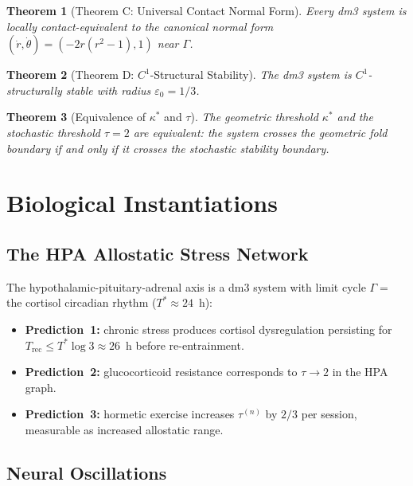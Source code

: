 \documentclass[11pt, twoside, openright]{book}
\theoremstyle{plain}
\newtheorem{theorem}{Theorem}[chapter]
\theoremstyle{definition}
\newcommand{\eps}{\varepsilon_0}
\begin{document}
\begin{theorem}[Theorem C: Universal Contact Normal Form]
Every dm3 system is locally contact-equivalent to the canonical normal
form $(\dot r, \dot\theta) = (-2r(r^2-1), 1)$ near $\Gamma$.
\end{theorem}

\begin{theorem}[Theorem D: $C^1$-Structural Stability]
The dm3 system is $C^1$-structurally stable with radius $\eps = 1/3$.
\end{theorem}

\begin{theorem}[Equivalence of $\kappa^*$ and $\tau$]
The geometric threshold $\kappa^*$ and the stochastic threshold $\tau = 2$
are equivalent: the system crosses the geometric fold boundary if and
only if it crosses the stochastic stability boundary.
\end{theorem}

\chapter{Biological Instantiations}

\section{The HPA Allostatic Stress Network}

The hypothalamic-pituitary-adrenal axis is a dm3 system with limit
cycle $\Gamma =$ the cortisol circadian rhythm ($T^* \approx 24$~h):
\begin{itemize}[leftmargin=*]
  \item \textbf{Prediction~1:} chronic stress produces cortisol
    dysregulation persisting for $T_{\mathrm{rec}} \le T^*\log 3
    \approx 26$~h before re-entrainment.
  \item \textbf{Prediction~2:} glucocorticoid resistance corresponds
    to $\tau \to 2$ in the HPA graph.
  \item \textbf{Prediction~3:} hormetic exercise increases $\tau^{(n)}$
    by $2/3$ per session, measurable as increased allostatic range.
\end{itemize}

\section{Neural Oscillations}
\end{document}
